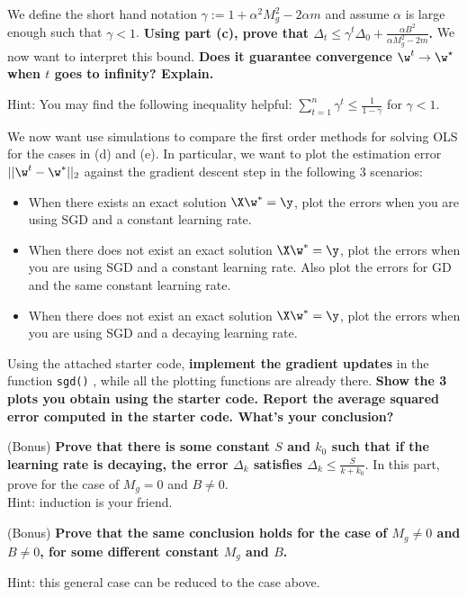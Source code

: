 \documentclass[preview]{standalone}
\begin{document}
\begin{Parts}
We define the short hand notation $\gamma:=1+\alpha^2 M_g^2 - 2\alpha
m $ and assume $\alpha$ is large enough such that $\gamma <
1$. \textbf{Using part (c), prove that
$\Delta_{t} \leq \gamma^t \Delta_{0} + \frac{\alpha B^2}{\alpha M_g^2
- 2m}$.}  We now want to interpret this bound. {\bf Does it guarantee
convergence $\w^t \to \w^\star$ when $t$ goes to infinity? Explain.}

Hint: You may find the following inequality helpful:
$\sum_{t=1}^n \gamma^t \leq \frac{1}{1-\gamma}$ for $\gamma <1 $.



\Part We now want use simulations to compare the first order methods for solving OLS for the cases in (d) and (e). In particular, we want to plot the estimation error $||\w^t - \w^*||_2$ against the gradient descent step in the following 3 scenarios:
\begin{itemize}
\item When there exists an exact solution $\X\w^* = \y$, plot the errors when you are using SGD and a constant learning rate. 
\item When there does not exist an exact solution $\X\w^* = \y$, plot the errors when you are using SGD and a constant learning rate. Also plot the errors for GD and the same constant learning rate. 
\item When there does not exist an exact solution $\X\w^* = \y$, plot the errors when you are using SGD and a decaying learning rate.
\end{itemize}
Using the attached starter code, {\bf implement the gradient updates} in the function \texttt{sgd()} , while all the plotting functions are already there. \textbf{Show the 3 plots you obtain using the starter code. Report the average squared error computed in the starter code. What's your conclusion?}





\Part (Bonus) {\bf Prove that there is some constant $S$ and $k_0$ such that if the learning rate is decaying, the error $\Delta_k$ satisfies $\Delta_k \leq \frac{S}{k+k_0}$}. In this part, prove for the case of $M_g=0$ and $B\neq 0$. \\

Hint: induction is your friend. 





\Part (Bonus) {\bf Prove that the same conclusion holds for the case of $M_g \neq 0$ and $B \neq 0$, for some different constant $M_g$ and $B$. }

Hint: this general case can be reduced to the case above. 



\end{Parts}
\end{document}
